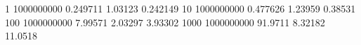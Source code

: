 1 1000000000 0.249711 1.03123 0.242149
10 1000000000 0.477626 1.23959 0.38531
100 1000000000 7.99571 2.03297 3.93302
1000 1000000000 91.9711 8.32182 11.0518
